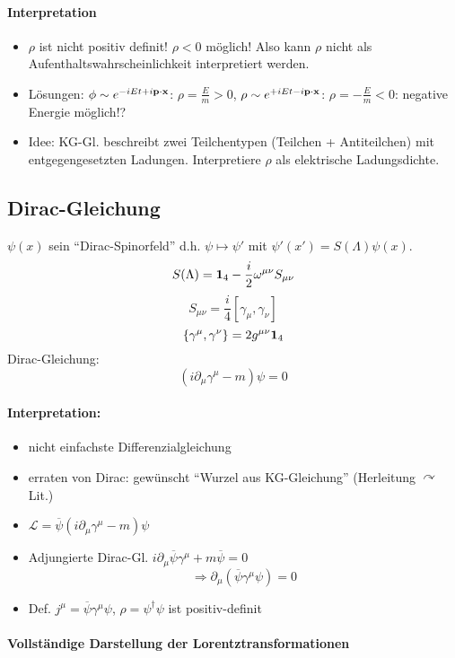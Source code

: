 \documentclass[11pt,a4paper]{report}
\begin{document}
\paragraph{Interpretation}
\begin{itemize}
\item $\rho$ ist nicht positiv definit! $\rho < 0$ möglich! Also kann $\rho$ nicht als Aufenthaltswahrscheinlichkeit interpretiert werden.
\item Lösungen: $\phi\sim e^{-iEt+i\mathbf{p}\cdot\mathbf{x}}$: $\rho = \frac{E}{m}>0$, $\rho\sim e^{+iEt-i\mathbf{p}\cdot\mathbf{x}}$: $\rho = -\frac{E}{m}<0$: negative Energie möglich!?
\item Idee: KG-Gl. beschreibt zwei Teilchentypen (Teilchen + Antiteilchen) mit entgegengesetzten Ladungen. Interpretiere $\rho$ als elektrische Ladungsdichte.
\end{itemize}

\subsection{Dirac-Gleichung}

$\psi (x)$ sein ``Dirac-Spinorfeld'' d.h. $\psi\mapsto \psi '$ mit $\psi'(x')=S(\Lambda ) \psi (x)$.
$$S(\Lambda ) = \mathbf{1}_4-\frac{i}{2}\omega^{\mu\nu}S_{\mu\nu}$$
$$S_{\mu\nu} = \frac{i}{4}[\gamma_\mu ,\gamma_\nu ]$$
$$\{\gamma^\mu ,\gamma^\nu\} = 2g^{\mu\nu}\mathbf{1}_4$$
Dirac-Gleichung:
$$\boxed{ (i\partial_\mu\gamma^\mu - m)\psi =0}$$

\paragraph{Interpretation:}
\begin{itemize}
\item nicht einfachste Differenzialgleichung
\item erraten von Dirac: gewünscht ``Wurzel aus KG-Gleichung'' (Herleitung $\curvearrowright$ Lit.)
\item $\mathcal{L} = \overline{\psi}(i\partial_\mu \gamma^\mu - m)\psi$
\item Adjungierte Dirac-Gl. $i\partial_\mu \overline{\psi}\gamma^\mu + m\overline{\psi} = 0$
$$\Rightarrow \partial_\mu (\overline{\psi}\gamma^\mu\psi )=0$$
\item Def. $j^\mu = \overline{\psi}\gamma^\mu\psi $, $\rho = \psi^\dagger\psi$ ist positiv-definit
\end{itemize}

\paragraph{Vollständige Darstellung der Lorentztransformationen}\mbox{}\par 
\end{document}
